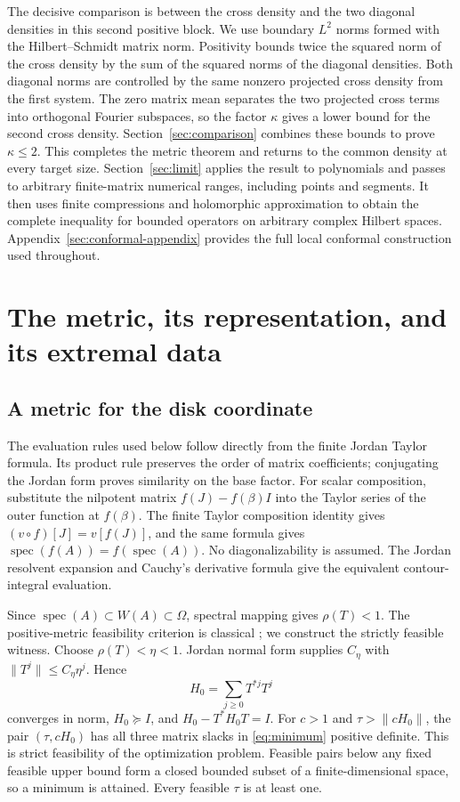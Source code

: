 \documentclass[11pt]{article}
\DeclareMathOperator{\spec}{spec}
\theoremstyle{definition}
\theoremstyle{remark}
\numberwithin{equation}{section}
\begin{document}
The decisive comparison is between the cross density and the two diagonal
densities in this second positive block. We use boundary $L^2$ norms formed
with the Hilbert--Schmidt matrix norm. Positivity bounds twice the squared
norm of the cross density by the sum of the squared norms
of the diagonal densities. Both diagonal norms are controlled by the same
nonzero projected cross density from the first system. The zero matrix mean
separates the two projected cross terms into orthogonal Fourier subspaces,
so the factor $\kappa$ gives a lower bound for the second cross density.
Section~\ref{sec:comparison} combines these bounds to prove $\kappa\le2$.
This completes the metric theorem and returns to
the common density at every target size. Section~\ref{sec:limit} applies
the result to polynomials and passes to arbitrary finite-matrix numerical
ranges, including points and segments. It then uses finite compressions
and holomorphic approximation to obtain the complete inequality for bounded
operators on arbitrary complex Hilbert spaces.
Appendix~\ref{sec:conformal-appendix}
provides the full local conformal construction used throughout.

\section{The metric, its representation, and its extremal data}\label{sec:metric}
\subsection{A metric for the disk coordinate}
The evaluation rules used below follow directly from the finite Jordan
Taylor formula. Its product rule preserves the order of matrix coefficients;
conjugating the Jordan form proves similarity on the base factor. For scalar
composition, substitute the nilpotent matrix $f(J)-f(\beta)I$ into the
Taylor series of the outer function at $f(\beta)$. The finite Taylor
composition identity gives $(v\circ f)[J]=v[f(J)]$, and the same formula
gives $\spec(f(A))=f(\spec(A))$. No diagonalizability is assumed.
The Jordan resolvent expansion and Cauchy's derivative formula give the
equivalent contour-integral evaluation.

Since $\spec(A)\subset W(A)\subset\Omega$, spectral mapping gives
$\rho(T)<1$. The positive-metric feasibility criterion is classical
\cite[Theorem 1]{Stein1952}; we construct the strictly feasible witness.
Choose $\rho(T)<\eta<1$. Jordan normal form supplies
$C_\eta$ with $\|T^j\|\le C_\eta\eta^j$. Hence
\[
 H_0=\sum_{j\ge0}T^{*j}T^j
\]
converges in norm, $H_0\succeq I$, and $H_0-T^*H_0T=I$.
For $c>1$ and $\tau>\|cH_0\|$, the pair $(\tau,cH_0)$ has all
three matrix slacks in \eqref{eq:minimum} positive definite. This is
strict feasibility of the optimization problem. Feasible pairs below any
fixed feasible upper bound form a closed bounded subset of a finite-dimensional
space, so a minimum is attained. Every feasible $\tau$ is at least one.
\end{document}
